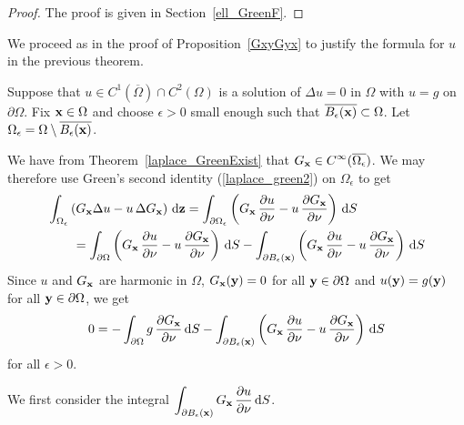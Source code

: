 \begin{proof}
The proof is given in Section~\ref{ell_GreenF}.
\end{proof}

We proceed as in the proof of Proposition~\ref{GxyGyx} to justify the
formula for $u$ in the previous theorem.

Suppose that $\displaystyle u \in C^1(\overline{\Omega}) \cap C^2(\Omega)$ is a
solution of $\Delta u = 0$ in $\Omega$ with $u = g$ on $\partial \Omega$.
Fix $\mathbf{x} \in \Omega$ and choose $\epsilon >0$ small enough such that
$\overline{B_{\epsilon}(\mathbf{x})} \subset \Omega$.
Let $\Omega_\epsilon = \Omega \setminus \overline{B_{\epsilon}(\mathbf{x})}$.

We have from Theorem~\ref{laplace_GreenExist} that
$\displaystyle G_{\mathbf{x}} \in C^\infty(\overline{\Omega_{\epsilon}})$.
We may therefore use Green's second identity (\ref{laplace_green2}) on
$\Omega_{\epsilon}$ to get
\[
\begin{split}
&\int_{\Omega_{\epsilon}} \left( G_{\mathbf{x}} \Delta u
- u\, \Delta G_{\mathbf{x}} \right) \,\mathrm{d}{\mathbf{z}}
= \int_{\partial \Omega_{\epsilon}} \left( G_{\mathbf{x}}\,\frac{\partial{u}}{\partial \mathbf{\nu}} 
- u\,\frac{\partial{G_{\mathbf{x}}}}{\partial \mathbf{\nu}} \right) \,\mathrm{d}{S} \\
& \qquad = \int_{\partial \Omega} \left( G_{\mathbf{x}}\,\frac{\partial{u}}{\partial \mathbf{\nu}} 
- u\,\frac{\partial{G_{\mathbf{x}}}}{\partial \mathbf{\nu}} \right) \,\mathrm{d}{S}
- \int_{\partial B_{\epsilon}(\mathbf{x})}
\left( G_{\mathbf{x}}\,\frac{\partial{u}}{\partial \mathbf{\nu}} 
- u\,\frac{\partial{G_{\mathbf{x}}}}{\partial \mathbf{\nu}} \right) \,\mathrm{d}{S}
\end{split}
\]
Since $u$ and $G_{\mathbf{x}}$ are harmonic in $\Omega$,
$G_{\mathbf{x}}(\mathbf{y}) = 0$ for all $\mathbf{y} \in \partial \Omega$ and
$u(\mathbf{y}) = g(\mathbf{y})$ for all $\mathbf{y} \in \partial \Omega$, we
get
\begin{equation} \label{lapDireq1}
  0 = - \int_{\partial \Omega} g\,\frac{\partial{G_{\mathbf{x}}}}{\partial \mathbf{\nu}} \,\mathrm{d}{S}
- \int_{\partial B_{\epsilon}(\mathbf{x})}
\left( G_{\mathbf{x}}\,\frac{\partial{u}}{\partial \mathbf{\nu}} 
- u\,\frac{\partial{G_{\mathbf{x}}}}{\partial \mathbf{\nu}} \right) \,\mathrm{d}{S}
\end{equation}
for all $\epsilon >0$.

We first consider the integral
$\displaystyle \int_{\partial B_{\epsilon}(\mathbf{x})}
G_{\mathbf{x}}\,\frac{\partial{u}}{\partial \mathbf{\nu}} \,\mathrm{d}{S}$.

